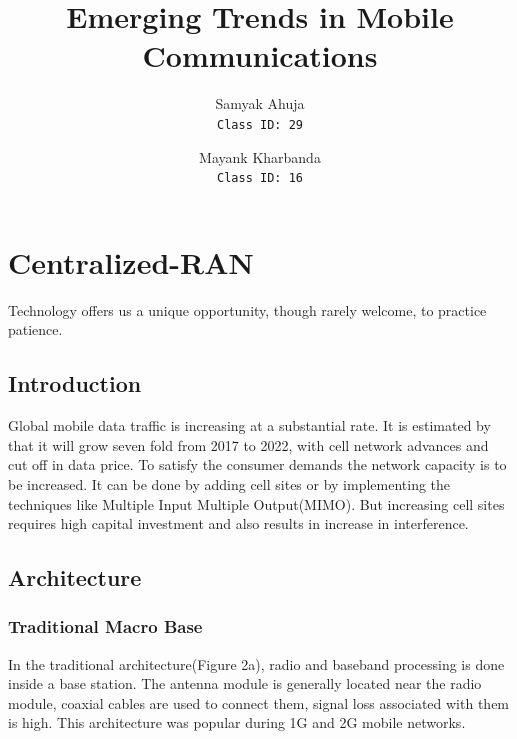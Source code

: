 \documentclass{article}
\title{Emerging Trends in Mobile Communications}
\author{
    Samyak Ahuja \\
    \texttt{Class ID: 29}
    \and
    Mayank Kharbanda \\
    \texttt{Class ID: 16}
}
\begin{document}
\maketitle

\section{Centralized-RAN}

\epigraph{Technology offers us a unique opportunity, 
though rarely welcome, to practice patience.}
{\parencite{patience12}}

\subsection{Introduction}

Global mobile data traffic is increasing at a substantial rate. 
It is estimated by \textcite{cisco19} that it will grow seven fold
from 2017 to 2022, with cell network advances and cut off in 
data price. To satisfy the consumer demands the network capacity 
is to be increased. It can be done by adding cell sites or by 
implementing the techniques like Multiple Input Multiple 
Output(MIMO). But increasing cell sites requires high capital 
investment and also results in increase in interference.
\nocite{checko14}


\subsection{Architecture}


\subsubsection{Traditional Macro Base}


In the traditional architecture(Figure 2a), radio and baseband
processing is done inside a base station. The antenna module 
is generally located near the radio module, coaxial cables
are used to connect them, signal loss associated with them is 
high. This architecture was popular during 1G and 2G mobile 
networks.\nocite{checko14}



\end{document}
